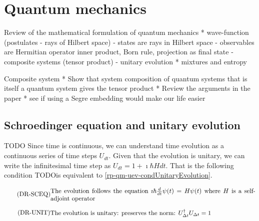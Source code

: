 \newcommand{\eqtext}[2][4.5in]{\parbox{#1}{#2}}


\def\>{\rangle}
\def\<{\langle}


\chapter{Quantum mechanics}


Review of the mathematical formulation of quantum mechanics
* wave-function (postulates - rays of Hilbert space)
- states are rays in Hilbert space
- observables are Hermitian operator inner product, Born rule, projection as final state
- composite systems (tensor product)
- unitary evolution
* mixtures and entropy

Composite system
* Show that system composition of quantum systems that is itself a quantum system gives the tensor product
* Review the arguments in the paper
* see if using a Segre embedding would make our life easier

\section{Schroedinger equation and unitary evolution}

TODO Since time is continuous, we can understand time evolution as a continuous series of time steps $U_{dt}$. Given that the evolution is unitary, we can write the infinitesimal time step as $U_{dt} = 1 + \imath \hbar H dt$. That is the following condition
TODOis equivalent to \ref{rp-qm-uev-condUnitaryEvolution}.


\begin{equation}\label{rp-qm-uev-condSchroedingerEq}
	\tag{DR-SCEQ}
	\eqtext{The evolution follows the equation $\imath \hbar \frac{d}{dt} \psi(t) = H \psi(t)$ where $H$ is a self-adjoint operator}
\end{equation}

\begin{equation}\label{rp-qm-uev-condUnitaryEvolution}
	\tag{DR-UNIT}
	\eqtext{The evolution is unitary: preserves the norm: $U^{\dagger}_{\Delta t} U_{\Delta t} = 1$} 
\end{equation}


